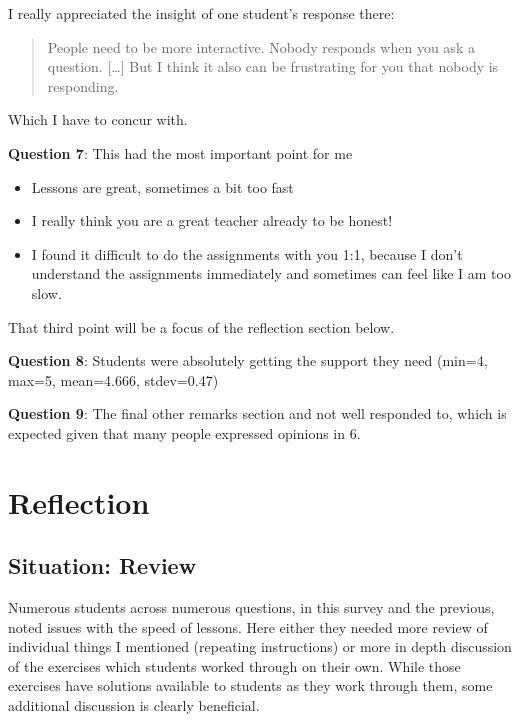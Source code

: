 \documentclass[paper=a4,justified,a4paper]{tufte-handout}
\providecommand{\tightlist}{%
  \setlength{\itemsep}{0pt}\setlength{\parskip}{0pt}}
\begin{document}
I really appreciated the insight of one student's response there:

\begin{quote}
People need to be more interactive. Nobody responds when you ask a
question. {[}\ldots{}{]} But I think it also can be frustrating for you
that nobody is responding.
\end{quote}

Which I have to concur with.

\textbf{Question 7}: This had the most important point for me

\begin{itemize}
\tightlist
\item
  Lessons are great, sometimes a bit too fast
\item
  I really think you are a great teacher already to be honest!
\item
  I found it difficult to do the assignments with you 1:1, because I
  don't understand the assignments immediately and sometimes can feel
  like I am too slow.
\end{itemize}

That third point will be a focus of the reflection section below.

\textbf{Question 8}: Students were absolutely getting the support they
need (min=4, max=5, mean=4.666, stdev=0.47)

\textbf{Question 9}: The final other remarks section and not well
responded to, which is expected given that many people expressed
opinions in 6.

\hypertarget{reflection}{%
\section{Reflection}\label{reflection}}

\hypertarget{situation-review}{%
\subsection{Situation: Review}\label{situation-review}}

Numerous students across numerous questions, in this survey and the
previous, noted issues with the speed of lessons. Here either they
needed more review of individual things I mentioned (repeating
instructions) or more in depth discussion of the exercises which
students worked through on their own. While those exercises have
solutions available to students as they work through them, some
additional discussion is clearly beneficial.
\end{document}

